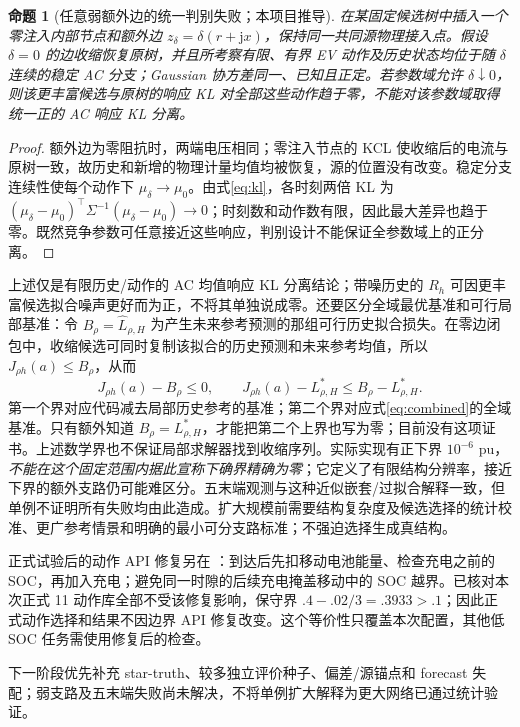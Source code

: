 \documentclass[UTF8,fontset=fandol,11pt,a4paper]{ctexart}
\newtheorem{proposition}{命题}
\begin{document}
\begin{proposition}[任意弱额外边的统一判别失败；本项目推导]
在某固定候选树中插入一个零注入内部节点和额外边 $z_\delta=\delta(r+\mathrm jx)$，保持同一共同源物理接入点。假设 $\delta=0$ 的边收缩恢复原树，并且所考察有限、有界 EV 动作及历史状态均位于随 $\delta$ 连续的稳定 AC 分支；Gaussian 协方差同一、已知且正定。若参数域允许 $\delta\downarrow0$，则该更丰富候选与原树的响应 KL 对全部这些动作趋于零，不能对该参数域取得统一正的 AC 响应 KL 分离。
\end{proposition}
\begin{proof}
额外边为零阻抗时，两端电压相同；零注入节点的 KCL 使收缩后的电流与原树一致，故历史和新增的物理计量均值均被恢复，源的位置没有改变。稳定分支连续性使每个动作下 $\mu_\delta\to\mu_0$。由式\eqref{eq:kl}，各时刻两倍 KL 为 $(\mu_\delta-\mu_0)^\top\Sigma^{-1}(\mu_\delta-\mu_0)\to0$；时刻数和动作数有限，因此最大差异也趋于零。既然竞争参数可任意接近这些响应，判别设计不能保证全参数域上的正分离。
\end{proof}
上述仅是有限历史/动作的 AC 均值响应 KL 分离结论；带噪历史的 $R_h$ 可因更丰富候选拟合噪声更好而为正，不将其单独说成零。还要区分全域最优基准和可行局部基准：令 $B_\rho=\widehat L_{\rho,H}$ 为产生未来参考预测的那组可行历史拟合损失。在零边闭包中，收缩候选可同时复制该拟合的历史预测和未来参考均值，所以 $J_{\rho h}(a)\le B_\rho$，从而
\[
 J_{\rho h}(a)-B_\rho\le0,\qquad
 J_{\rho h}(a)-L_{\rho,H}^*
       \le B_\rho-L_{\rho,H}^* .
\]
第一个界对应代码减去局部历史参考的基准；第二个界对应式\eqref{eq:combined}的全域基准。只有额外知道 $B_\rho=L_{\rho,H}^*$，才能把第二个上界也写为零；目前没有这项证书。上述数学界也不保证局部求解器找到收缩序列。实际实现有正下界 $10^{-6}$ pu，\emph{不能在这个固定范围内据此宣称下确界精确为零}；它定义了有限结构分辨率，接近下界的额外支路仍可能难区分。五末端观测与这种近似嵌套/过拟合解释一致，但单例不证明所有失败均由此造成。扩大规模前需要结构复杂度及候选选择的统计校准、更广参考情景和明确的最小可分支路标准；不强迫选择生成真结构。

正式试验后的动作 API 修复另在 ：到达后先扣移动电池能量、检查充电之前的 SOC，再加入充电；避免同一时隙的后续充电掩盖移动中的 SOC 越界。已核对本次正式 11 动作库全部不受该修复影响，保守界 $.4-.02/3=.3933>.1$；因此正式动作选择和结果不因边界 API 修复改变。这个等价性只覆盖本次配置，其他低 SOC 任务需使用修复后的检查。

下一阶段优先补充 star-truth、较多独立评价种子、偏差/源锚点和 forecast 失配；弱支路及五末端失败尚未解决，不将单例扩大解释为更大网络已通过统计验证。
\end{document}
